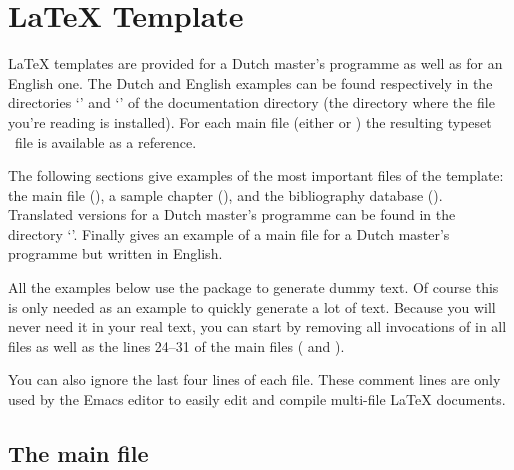 \newcommand*\showfile[1]{%
  \begingroup
    \setverbatimfont{\normalfont\ttfamily\footnotesize}%
    \bvperpagefalse
    \linenumberfrequency{1}\resetbvlinenumber
    \linenumberfont{\rmfamily\tiny}%
    \bvnumbersoutside
    \renewcommand*\bvtoprulehook{%
      \hrule width\linewidth \nobreak
      \hbox to\linewidth{%
        \hss \smash{\colorbox[gray]{.9}{\ttfamily\enspace #1\enspace}}\qquad}%
      \nobreak\vskip-.1pt\nobreak\vskip-\lineskip\relax}%
    \boxedverbatiminput{../#1}%
    \tracingnone
  \endgroup}

\chapter{LaTeX Template}
\label{app:template}
LaTeX templates are provided for a Dutch master's programme as well as for an
English one. The Dutch and English examples can be found respectively in the
directories `' and `' of the documentation
directory (the directory where the file you're reading is installed). For each
main file (either  or ) the resulting
typeset \PDF\ file is available as a reference.

The following sections give examples of the most important files of the
template: the main file (), a sample chapter
(), and the bibliography database ().
Translated versions for a Dutch master's programme can be found in the directory
`'. Finally  gives an example of a main
file for a Dutch master's programme but written in English.

All the examples below use the  package to generate dummy text.
Of course this is only needed as an example to quickly generate a lot of
text. Because you will never need it in your real text, you can start by
removing all invocations of  in all files as well as the lines
24--31 of the main files ( and ).

You can also ignore the last four lines of each  file. These
comment lines are only used by the Emacs editor to easily edit and compile
multi-file LaTeX documents.

\section{The main file}
\label{sec:file:main}
\showfile{template/thesis.tex}

